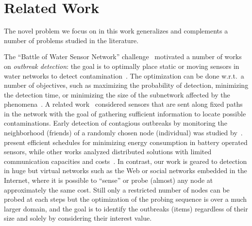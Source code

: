 \section{Related Work}\label{sec:related_work}
The novel problem we focus on in this work generalizes and complements a number of problems
studied in the literature.

The  ``Battle of Water Sensor Network'' challenge~\citep{BWSN2008} motivated a
number of works on \emph{outbreak detection}: the goal is to optimally place
static or moving sensors in water networks to detect
contamination~\citep{Leskovec2007,Krause2008,Hart2010}. The optimization can be
done w.r.t.~a number of objectives, such as maximizing the probability of
detection, minimizing the detection time, or minimizing the size of the
subnetwork affected by the phenomena~\citep{Leskovec2007}. A related
work~\citep{AgumbeSuresh2012} considered sensors that are sent along fixed paths
in the network with the goal of gathering sufficient information to locate
possible contaminations. Early detection of contagious outbreaks by monitoring
the neighborhood (friends) of a randomly chosen node (individual) was studied
by~\citet{Christakis2010}.  \citet{Krause2009} present efficient schedules for
minimizing energy consumption in battery operated sensors, while other works
analyzed distributed solutions with limited communication capacities and
costs~\citep{Krause2011Kleinberg,Golovin2010,Krause2011}. %
In contrast, our work is geared to detection in huge but virtual networks such
as the Web or social networks embedded in the Internet, where it is possible to
``sense'' or probe (almost) any node at approximately the same cost. Still only
a restricted number of nodes can be probed at each steps but the optimization of
the probing sequence is over a much larger domain, and the goal is to identify
the outbreaks (items) regardless of their size and solely by considering their
interest value.

